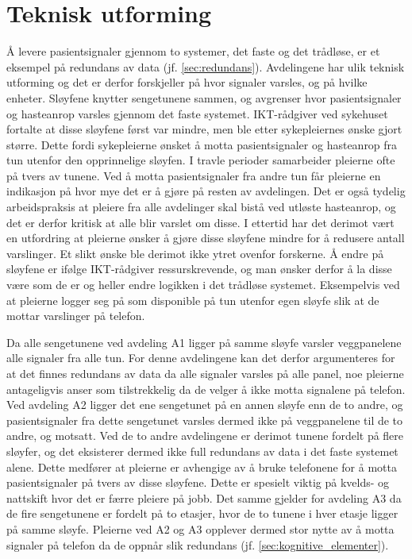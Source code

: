\section{Teknisk utforming}
Å levere pasientsignaler gjennom to systemer, det faste og det trådløse, er et eksempel på redundans av data (jf. \ref{sec:redundans}). Avdelingene har ulik teknisk utforming og det er derfor forskjeller på hvor signaler varsles, og på hvilke enheter. Sløyfene knytter sengetunene sammen, og avgrenser hvor pasientsignaler og hasteanrop varsles gjennom det faste systemet. IKT-rådgiver ved sykehuset fortalte at disse sløyfene først var mindre, men ble etter sykepleiernes ønske gjort større. Dette fordi sykepleierne ønsket å motta pasientsignaler og hasteanrop fra tun utenfor den opprinnelige sløyfen. I travle perioder samarbeider pleierne ofte på tvers av tunene. Ved å motta pasientsignaler fra andre tun får pleierne en indikasjon på hvor mye det er å gjøre på resten av avdelingen. Det er også tydelig arbeidspraksis at pleiere fra alle avdelinger skal bistå ved utløste hasteanrop, og det er derfor kritisk at alle blir varslet om disse. I ettertid har det derimot vært en utfordring at pleierne ønsker å gjøre disse sløyfene mindre for å redusere antall varslinger. Et slikt ønske ble derimot ikke ytret ovenfor forskerne. Å endre på sløyfene er ifølge IKT-rådgiver ressurskrevende, og man ønsker derfor å la disse være som de er og heller endre logikken i det trådløse systemet. Eksempelvis ved at pleierne logger seg på som disponible på tun utenfor egen sløyfe slik at de mottar varslinger på telefon.

\noindent
Da alle sengetunene ved avdeling A1 ligger på samme sløyfe varsler veggpanelene alle signaler fra alle tun. For denne avdelingene kan det derfor argumenteres for at det finnes redundans av data da alle signaler varsles på alle panel, noe pleierne antageligvis anser som tilstrekkelig da de velger å ikke motta signalene på telefon. Ved avdeling A2 ligger det ene sengetunet på en annen sløyfe enn de to andre, og pasientsignaler fra dette sengetunet varsles dermed ikke på veggpanelene til de to andre, og motsatt. Ved de to andre avdelingene er derimot tunene fordelt på flere sløyfer, og det eksisterer dermed ikke full redundans av data i det faste systemet alene. Dette medfører at pleierne er avhengige av å bruke telefonene for å motta pasientsignaler på tvers av disse sløyfene. Dette er spesielt viktig på kvelds- og nattskift hvor det er færre pleiere på jobb. Det samme gjelder for avdeling A3 da de fire sengetunene er fordelt på to etasjer, hvor de to tunene i hver etasje ligger på samme sløyfe. Pleierne ved A2 og A3 opplever dermed stor nytte av å motta signaler på telefon da de oppnår slik redundans (jf. \ref{sec:kognitive_elementer}).

